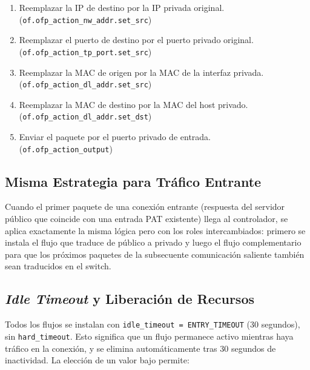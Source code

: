\documentclass[11pt, a4paper]{article}
\begin{document}
\begin{enumerate}
    \item Reemplazar la IP de destino por la IP privada original. \\
          (\texttt{of.ofp\_action\_nw\_addr.set\_src})

    \item Reemplazar el puerto de destino por el puerto privado original. \\
          (\texttt{of.ofp\_action\_tp\_port.set\_src})

    \item Reemplazar la MAC de origen por la MAC de la interfaz privada. \\
          (\texttt{of.ofp\_action\_dl\_addr.set\_src})

    \item Reemplazar la MAC de destino por la MAC del host privado. \\
          (\texttt{of.ofp\_action\_dl\_addr.set\_dst})

    \item Enviar el paquete por el puerto privado de entrada. \\
          (\texttt{of.ofp\_action\_output})
\end{enumerate}

\subsection{Misma Estrategia para Tráfico Entrante}
\label{subsec:flow_in_reverse}

Cuando el primer paquete de una conexión entrante (respuesta del servidor público que coincide con una entrada PAT existente) llega al controlador, se aplica exactamente la misma lógica pero con los roles intercambiados: primero se instala el flujo que traduce de público a privado y luego el flujo complementario para que los próximos paquetes de la subsecuente comunicación saliente también sean traducidos en el switch.

\subsection{\textit{Idle Timeout} y Liberación de Recursos}
\label{subsec:timeout}

Todos los flujos se instalan con \texttt{idle\_timeout = ENTRY\_TIMEOUT} (30 segundos), sin \texttt{hard\_timeout}. Esto significa que un flujo permanece activo mientras haya tráfico en la conexión, y se elimina automáticamente tras 30 segundos de inactividad. La elección de un valor bajo permite:
\end{document}
